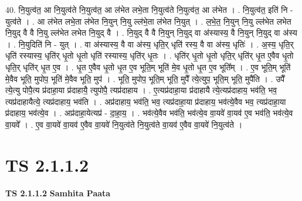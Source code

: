 \documentclass[17pt]{extarticle}
\begin{document}
40. नि॒युत्व॑त॒ आ नि॒युत्व॑ते नि॒युत्व॑त॒ आ ल॑भेत लभे॒ता नि॒युत्व॑ते नि॒युत्व॑त॒ आ ल॑भेत । . नि॒युत्व॑त॒ इति॑ नि - युत्व॑ते । . आ ल॑भेत लभे॒ता ल॑भेत नि॒युन् नि॒यु ल्ल॑भे॒ता ल॑भेत नि॒युत् । . ल॒भे॒त॒ नि॒युन् नि॒यु ल्ल॑भेत लभेत नि॒युद् वै वै नि॒यु ल्ल॑भेत लभेत नि॒युद् वै । . नि॒युद् वै वै नि॒युन् नि॒युद् वा अ॑स्यास्य॒ वै नि॒युन् नि॒युद् वा अ॑स्य । . नि॒युदिति॑ नि - युत् । . वा अ॑स्यास्य॒ वै वा अ॑स्य॒ धृति॒र् धृति॑ रस्य॒ वै वा अ॑स्य॒ धृतिः॑ । . अ॒स्य॒ धृति॒र् धृति॑ रस्यास्य॒ धृति॑र् धृ॒तो धृ॒तो धृति॑ रस्यास्य॒ धृति॑र् धृ॒तः । . धृति॑र् धृ॒तो धृ॒तो धृति॒र् धृति॑र् धृ॒त ए॒वैव धृ॒तो धृति॒र् धृति॑र् धृ॒त ए॒व । . धृ॒त ए॒वैव धृ॒तो धृ॒त ए॒व भूति॒म् भूति॑ मे॒व धृ॒तो धृ॒त ए॒व भूति᳚म् । . ए॒व भूति॒म् भूति॑ मे॒वैव भूति॒ मुपोप॒ भूति॑ मे॒वैव भूति॒ मुप॑ । . भूति॒ मुपोप॒ भूति॒म् भूति॒ मुपै᳚ त्ये॒त्युप॒ भूति॒म् भूति॒ मुपै॑ति । . उपै᳚ त्ये॒त्यु पोपै॒त्य प्र॑दाहा॒या प्र॑दाहायै॒ त्युपोपै॒ त्यप्र॑दाहाय । . ए॒त्यप्र॑दाहा॒या प्र॑दाहायै त्ये॒त्यप्र॑दाहाय॒ भव॑ति॒ भव॒ त्यप्र॑दाहायैत्ये॒ त्यप्र॑दाहाय॒ भव॑ति । . अप्र॑दाहाय॒ भव॑ति॒ भव॒ त्यप्र॑दाहा॒या प्र॑दाहाय॒ भव॑त्ये॒वैव भव॒ त्यप्र॑दाहा॒या प्र॑दाहाय॒ भव॑त्ये॒व । . अप्र॑दाहा॒येत्यप्र॑ - दा॒हा॒य॒ । . भव॑त्ये॒वैव भव॑ति॒ भव॑त्ये॒व वा॒यवे॑ वा॒यव॑ ए॒व भव॑ति॒ भव॑त्ये॒व वा॒यवे᳚ । . ए॒व वा॒यवे॑ वा॒यव॑ ए॒वैव वा॒यवे॑ नि॒युत्व॑ते नि॒युत्व॑ते वा॒यव॑ ए॒वैव वा॒यवे॑ नि॒युत्व॑ते । \newline
\pagebreak
{}
\section*{ TS 2.1.1.2 }

\textbf{TS 2.1.1.2 } \newline
\textbf{Samhita Paata} \newline
\end{document}

